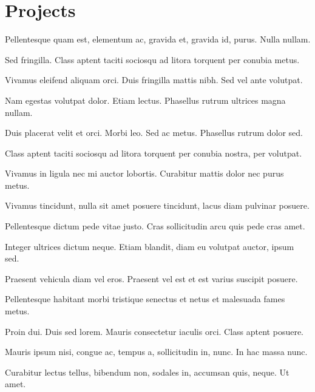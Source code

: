 \documentclass[letterpaper,10pt]{resume}
\begin{document}
    \section{Projects}
            \begin{items}
                \item Pellentesque quam est, elementum ac, gravida et, gravida id, purus. Nulla nullam.
                \item Sed fringilla. Class aptent taciti sociosqu ad litora torquent per conubia metus.
                \item Vivamus eleifend aliquam orci. Duis fringilla mattis nibh. Sed vel ante volutpat.
                \item Nam egestas volutpat dolor. Etiam lectus. Phasellus rutrum ultrices magna nullam.
                \item Duis placerat velit et orci. Morbi leo. Sed ac metus. Phasellus rutrum dolor sed.
                \item Class aptent taciti sociosqu ad litora torquent per conubia nostra, per volutpat.
            \end{items}
        \endplace
            \begin{items}
                \item Vivamus in ligula nec mi auctor lobortis. Curabitur mattis dolor nec purus metus.
                \item Vivamus tincidunt, nulla sit amet posuere tincidunt, lacus diam pulvinar posuere.
                \item Pellentesque dictum pede vitae justo. Cras sollicitudin arcu quis pede cras amet.
                \item Integer ultrices dictum neque. Etiam blandit, diam eu volutpat auctor, ipsum sed.
                \item Praesent vehicula diam vel eros. Praesent vel est et est varius suscipit posuere.
                \item Pellentesque habitant morbi tristique senectus et netus et malesuada fames metus.
                \item Proin dui. Duis sed lorem. Mauris consectetur iaculis orci. Class aptent posuere.
                \item Mauris ipsum nisi, congue ac, tempus a, sollicitudin in, nunc. In hac massa nunc.
                \item Curabitur lectus tellus, bibendum non, sodales in, accumsan quis, neque. Ut amet.
            \end{items}
        \endplace
    \endsection
\end{document}
